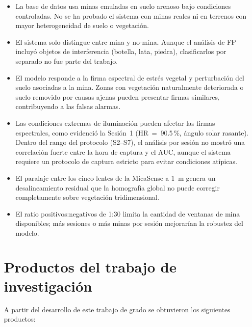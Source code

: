 \begin{itemize}
  \item La base de datos usa minas emuladas en suelo arenoso bajo condiciones
    controladas. No se ha probado el sistema con minas reales ni en terrenos
    con mayor heterogeneidad de suelo o vegetación.
  \item El sistema solo distingue entre mina y no-mina. Aunque el análisis
    de FP incluyó objetos de interferencia (botella, lata, piedra),
    clasificarlos por separado no fue parte del trabajo.
  \item El modelo responde a la firma espectral de estrés vegetal y
    perturbación del suelo asociadas a la mina. Zonas con vegetación
    naturalmente deteriorada o suelo removido por causas ajenas pueden
    presentar firmas similares, contribuyendo a las falsas alarmas.
  \item Las condiciones extremas de iluminación pueden afectar las firmas
    espectrales, como evidenció la Sesión~1 (HR~=~90.5\,\%, ángulo solar
    rasante). Dentro del rango del protocolo (S2--S7), el análisis por
    sesión no mostró una correlación fuerte entre la hora de captura y el
    AUC, aunque el sistema requiere un protocolo de captura estricto para
    evitar condiciones atípicas.
  \item El paralaje entre los cinco lentes de la MicaSense a \SI{1}{m}
    genera un desalineamiento residual que la homografía global no puede
    corregir completamente sobre vegetación tridimensional.
  \item El ratio positivos:negativos de 1:30 limita la cantidad de ventanas de
    mina disponibles; más sesiones o más minas por sesión mejorarían la robustez
    del modelo.
\end{itemize}

\section{Productos del trabajo de investigación}

A partir del desarrollo de este trabajo de grado se obtuvieron los
siguientes productos:

